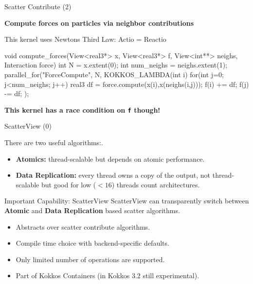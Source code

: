 \begin{frame}[fragile]{Scatter Contribute (2)}

  \textbf{Compute forces on particles via neighbor contributions}

  This kernel uses Newtons Third Law: Actio = Reactio
  \begin{code}[keywords={void,int,parallel_for,for,View}]
void compute_forces(View<real3*> x, View<real3*> f,
	            View<int**> neighs, Interaction force) {
  int N = x.extent(0);
  int num_neighs = neighs.extent(1);
  parallel_for("ForceCompute", N, KOKKOS_LAMBDA(int i) {
    for(int j=0; j<num_neighs; j++) {
      real3 df = force.compute(x(i),x(neighs(i,j)));
      f(i) += df;
      f(j) -= df;
    }
  });
}
  \end{code}

  \pause
  \textbf{This kernel has a race condition on \texttt{f} though!}

\end{frame}

\begin{frame}[fragile]{ScatterView (0)}

  There are two useful algorithms:.
 
  \begin{itemize}
	  \item{\textbf{Atomics:} thread-scalable but depends on atomic performance.}
	  \item{\textbf{Data Replication:} every thread owns a copy of the output, not thread-scalable but good for low ($<16$) threads count architectures.}
  \end{itemize}

  \pause
  \begin{block}{Important Capability: ScatterView}
	  ScatterView can transparently switch between \textbf{Atomic} and \textbf{Data Replication} based scatter algorithms.
  \end{block}
  \pause
 	
  \begin{itemize}
	  \item{Abstracts over scatter contribute algorithms.}
	  \item{Compile time choice with backend-specific defaults.}
          \item{Only limited number of operations are supported.}
	  \item{Part of Kokkos Containers (in Kokkos 3.2 still experimental).}
  \end{itemize}

\end{frame}



